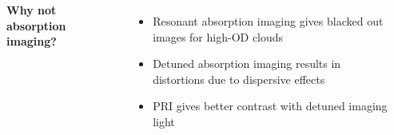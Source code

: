 \documentclass[26pt, paperwidth=36in,paperheight=48in]{tikzposter} %
\newcommand{\myfont}{\fontsize{26}{40}\selectfont}
\begin{document}
\begin{columns}
{\begin{minipage}{0.15\textwidth}
		\\
	\end{minipage}
	
	\vspace{2.0cm}
	
	\begin{minipage}{0.28\textwidth}
		\flushleft
		\vspace{0.5cm}
		\textbf{Why not absorption imaging?}
		\vspace{0.5cm}
		\myfont
		\begin{minipage}{0.75\textwidth}
			\flushleft
			\vspace{1.0cm}
			\begin{itemize}				
				\item Resonant absorption imaging gives blacked out images for high-OD clouds
				
				\item Detuned absorption imaging results in distortions due to dispersive effects
				
				\item PRI gives better contrast with detuned imaging light
				

\end{itemize}
\end{minipage}
\end{minipage}}
\end{columns}
\end{document}
